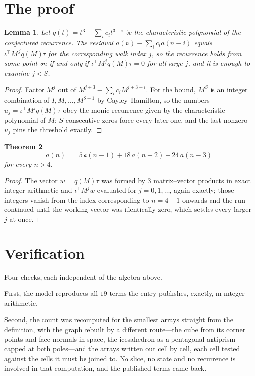 \documentclass[11pt,a4paper]{article}
\theoremstyle{plain}
\newtheorem{theorem}{Theorem}
\newtheorem{lemma}[theorem]{Lemma}
\theoremstyle{definition}
\begin{document}
\section{The proof}

\begin{lemma}\label{lem:crit}
Let $q(t)=t^{3}-\sum_i c_it^{3-i}$ be the characteristic polynomial of the
conjectured recurrence. The residual $a(n)-\sum_ic_ia(n-i)$ equals
$\iota^{\!\top}M^{\,j}q(M)\tau$ for the corresponding walk index $j$, so the recurrence
holds from some point on if and only if $\iota^{\!\top}M^{j}q(M)\tau=0$ for all large $j$,
and it is enough to examine $j<S$.
\end{lemma}

\begin{proof}
Factor $M^{j}$ out of $M^{j+3}-\sum_ic_iM^{j+3-i}$. For the bound, $M^{S}$
is an integer combination of $I,M,\dots,M^{S-1}$ by Cayley--Hamilton, so the numbers
$u_j=\iota^{\!\top}M^{j}q(M)\tau$ obey the monic recurrence given by the characteristic
polynomial of $M$; $S$ consecutive zeros force every later one, and the last nonzero $u_j$
pins the threshold exactly.
\end{proof}

\begin{theorem}
\[
a(n)\;=\;5\,a(n-1) + 18\,a(n-2) - 24\,a(n-3)
\]
for every $n>4$.
\end{theorem}

\begin{proof}
The vector $w=q(M)\tau$ was formed by $3$ matrix--vector products in exact integer
arithmetic and $\iota^{\!\top}M^{j}w$ evaluated for $j=0,1,\dots$, again exactly; those
integers vanish from the index corresponding to $n=4+1$ onwards and the run continued
until the working vector was identically zero, which settles every larger $j$ at once.
\end{proof}

\section{Verification}

Four checks, each independent of the algebra above.

First, the model reproduces all $19$ terms the entry publishes, exactly, in integer
arithmetic.

Second, the count was recomputed for the smallest arrays straight from the definition, with the
graph rebuilt by a different route---the cube from its corner points and face normals in space,
the icosahedron as a pentagonal antiprism capped at both poles---and the arrays written out cell
by cell, each cell tested against the cells it must be joined to. No slice, no state and no
recurrence is involved in that computation, and the published terms came back.
\end{document}
